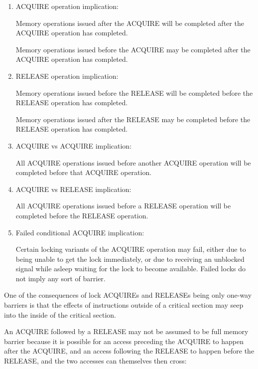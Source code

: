 \begin{enumerate}
 \item
     ACQUIRE operation implication:

     Memory operations issued after the ACQUIRE will be completed after the
     ACQUIRE operation has completed.

     Memory operations issued before the ACQUIRE may be completed after
     the ACQUIRE operation has completed.

 \item
     RELEASE operation implication:

     Memory operations issued before the RELEASE will be completed before the
     RELEASE operation has completed.

     Memory operations issued after the RELEASE may be completed before the
     RELEASE operation has completed.

 \item
     ACQUIRE vs ACQUIRE implication:

     All ACQUIRE operations issued before another ACQUIRE operation will be
     completed before that ACQUIRE operation.

 \item
     ACQUIRE vs RELEASE implication:

     All ACQUIRE operations issued before a RELEASE operation will be
     completed before the RELEASE operation.

 \item
     Failed conditional ACQUIRE implication:

     Certain locking variants of the ACQUIRE operation may fail, either due to
     being unable to get the lock immediately, or due to receiving an unblocked
     signal while asleep waiting for the lock to become available.
     Failed locks do not imply any sort of barrier.
\end{enumerate}

\begin{Note}
One of the consequences of lock ACQUIREs and RELEASEs being only
one-way barriers is that the effects of instructions outside of a critical
section may seep into the inside of the critical section.
\end{Note}

An ACQUIRE followed by a RELEASE may not be assumed to be full memory barrier
because it is possible for an access preceding the ACQUIRE to happen after the
ACQUIRE, and an access following the RELEASE to happen before the RELEASE, and
the two accesses can themselves then cross:

